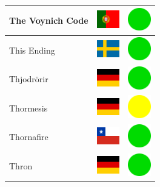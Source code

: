 \documentclass[12pt, a4paper, twoside]{report}
\begin{document}
\begin{center}
\begin{longtable}{|p{5cm}|p{2cm}|p{2cm}|}
 The Voynich Code                                           & \includegraphics[width=1cm]{../4x3/pt} &   \includegraphics[width=1cm]{../likes/y} \\ \hline
 This Ending                                                & \includegraphics[width=1cm]{../4x3/se} &   \includegraphics[width=1cm]{../likes/y} \\ \hline
 Thjodrörir                                                 & \includegraphics[width=1cm]{../4x3/de} &   \includegraphics[width=1cm]{../likes/y} \\ \hline
 Thormesis                                                  & \includegraphics[width=1cm]{../4x3/de} &   \includegraphics[width=1cm]{../likes/m} \\ \hline
 Thornafire                                                 & \includegraphics[width=1cm]{../4x3/cl} &   \includegraphics[width=1cm]{../likes/y} \\ \hline
 Thron                                                      & \includegraphics[width=1cm]{../4x3/de} &   \includegraphics[width=1cm]{../likes/y} \\ \hline

\end{longtable}
\end{center}
\end{document}
